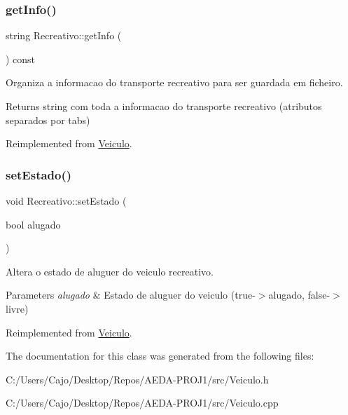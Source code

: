 \subsubsection{\texorpdfstring{get\+Info()}{getInfo()}}
{\footnotesize\ttfamily string Recreativo\+::get\+Info (\begin{DoxyParamCaption}{ }\end{DoxyParamCaption}) const\hspace{0.3cm}{\ttfamily [virtual]}}



Organiza a informacao do transporte recreativo para ser guardada em ficheiro. 

\begin{DoxyReturn}{Returns}
string com toda a informacao do transporte recreativo (atributos separados por tabs) 
\end{DoxyReturn}


Reimplemented from \mbox{\hyperlink{class_veiculo_a37cf6866bac6b2e7e8837237ec293d48}{Veiculo}}.

\mbox{\label{class_recreativo_a43fca1861ff7f7f068fe303cb8f44d3d}} 
\subsubsection{\texorpdfstring{set\+Estado()}{setEstado()}}
{\footnotesize\ttfamily void Recreativo\+::set\+Estado (\begin{DoxyParamCaption}\item[{bool}]{alugado }\end{DoxyParamCaption})\hspace{0.3cm}{\ttfamily [virtual]}}



Altera o estado de aluguer do veiculo recreativo. 


\begin{DoxyParams}{Parameters}
{\em alugado} & Estado de aluguer do veiculo (true-\/$>$alugado, false-\/$>$livre) \\
\hline
\end{DoxyParams}


Reimplemented from \mbox{\hyperlink{class_veiculo}{Veiculo}}.



The documentation for this class was generated from the following files\+:\begin{DoxyCompactItemize}
\item 
C\+:/\+Users/\+Cajo/\+Desktop/\+Repos/\+A\+E\+D\+A-\/\+P\+R\+O\+J1/src/Veiculo.\+h\item 
C\+:/\+Users/\+Cajo/\+Desktop/\+Repos/\+A\+E\+D\+A-\/\+P\+R\+O\+J1/src/Veiculo.\+cpp\end{DoxyCompactItemize}

